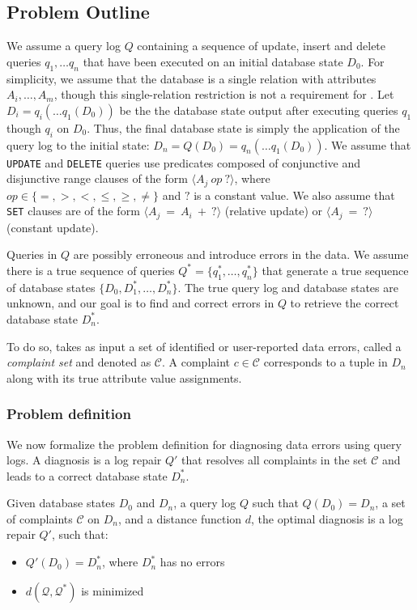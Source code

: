 \subsection{Problem Outline}

We assume a query log $Q$ containing a sequence of update, insert and delete queries 
$q_1, \ldots q_n$  that have been executed on an initial database state $D_0$.  
For simplicity, we assume that the database is a single relation with attributes 
$A_i,\ldots,A_m$, though this single-relation restriction is not a requirement for \sys.
Let $D_i = q_i(\ldots q_1(D_0))$ be the the database state output after executing queries $q_1$ though $q_i$ on $D_0$.
Thus, the final database state is simply the application of the query log to
the initial state: $D_n = Q(D_0) = q_n(\ldots q_1(D_0))$.
We assume that \texttt{UPDATE} and \texttt{DELETE} queries use predicates composed of conjunctive and disjunctive range clauses
of the form $\langle A_j\ op\ ?\rangle$, where $op \in \{=, >, <, \le, \ge, \ne\}$ and $?$ is a constant value.
We also assume that \texttt{SET} clauses are of the form $\langle A_j\ =\ A_i\ +\ ? \rangle$ (relative update) or $\langle A_j\ =\ ?\rangle$ (constant update).

Queries in $Q$ are possibly erroneous and introduce errors in the data.  We assume there is 
a true sequence of queries $Q^* = \{q^*_1,\ldots,q^*_n\}$ that generate a true sequence of database states
$\{D_0, D^*_1,\ldots,D^*_n\}$.  The true query log and database states are unknown, and our goal is to 
find and correct errors in $Q$ to retrieve the correct database state $D^*_n$.

To do so, \sys takes as input a set of identified or user-reported
data errors, called a {\it complaint set} and denoted as $\mathcal{C}$. 
A complaint $c \in \mathcal{C}$ corresponds to a tuple in $D_n$ along with its true attribute value assignments.  



\subsubsection*{Problem definition}

We now formalize the problem definition for diagnosing data
errors using query logs. A diagnosis is a log repair
$Q'$ that resolves all complaints in the set $\mathcal{C}$
and leads to a correct database state $D_n^*$.

\begin{definition}\label{def:problem}
    Given database states $D_0$ and $D_n$, a query log $Q$ 
    such that $Q(D_0)=D_n$, a set of complaints $\mathcal{C}$ on $D_n$,  
    and a distance function $d$, the optimal diagnosis is a 
    log repair $Q'$, such that:
    \begin{itemize}[itemsep=0pt, parsep=0pt]
        \item $Q'(D_0)=D_n^*$, where $D_n^*$ has no errors
        \item $d(\mathcal{Q}, \mathcal{Q}^*)$ is minimized
    \end{itemize}
\end{definition}

